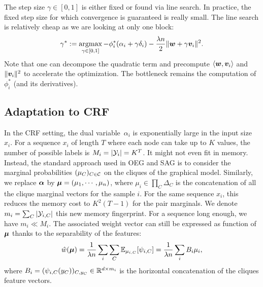 The step size $\gamma \in [0,1]$  is either fixed or found via line search.
In practice, the fixed step size for which convergence is guaranteed is really small.
The line search is relatively cheap as we are looking at only one block:
\begin{equation}\label{line search equation}
	\gamma^*
	:= \operatorname*{argmax}_{\gamma \in [0,1]} - \phi^*_i(\alpha_i + \gamma \delta_i)
	- \frac{\lambda n}{2} \| \boldsymbol{w} + \gamma \bm v_i \|^2.
\end{equation}
Note that one can decompose the quadratic term and precompute $ \langle \boldsymbol{w}, \bm v_i \rangle$ and $\| \bm v_i \|^2 $ to accelerate the optimization.
The bottleneck remains the computation of $\phi^*_i$ (and its derivatives).




\subsection{Adaptation to CRF}
In the CRF setting, the dual variable~$\alpha_i$ is exponentially large in the input size~$x_i$.
For a sequence $x_i$ of length $T$ where each node can take up to $K$ values, the number of possible labels is $M_i = |{\mathcal Y}_i | = K^{T}$.
It might not even fit in memory.
Instead, the standard approach used in OEG and SAG is to consider the marginal probabilities $(\mu_C)_{C \in {\mathcal C}}$ on the cliques of the graphical model.
Similarly, we replace $\boldsymbol{\alpha}$ by $\boldsymbol{\mu} = (\mu_1, \cdots, \mu_n)$, where $\mu_i \in \prod_C \Delta_{C}$ is the concatenation of all the clique marginal vectors for the sample $i$.
For the same sequence $x_i$, this reduces the memory cost to $K^2(T-1)$ for the pair marginals.
We denote $m_i= \sum_C |{\mathcal Y}_{i, C} |$ this new memory fingerprint.
For a sequence long enough, we have $m_i \ll M_i$.
The associated weight vector can still be expressed as function of $\boldsymbol{\mu}$ thanks to the separability of the features:
\begin{equation}
	\label{weights from marginals}
	\hat w (\boldsymbol{\mu}) = \frac{1}{\lambda n} \sum_i \sum_C \mathbb E_{\mu_{i, C}}[\psi_{i, C}]
	= \frac{1}{\lambda n} \sum_i B_i \mu_i,
\end{equation}
where $B_i = (\psi_{i,C}(y_{C}) )_{C, y_C} \in \mathbb{R}^{d \times m_i}$ is the horizontal concatenation of the cliques feature vectors.

